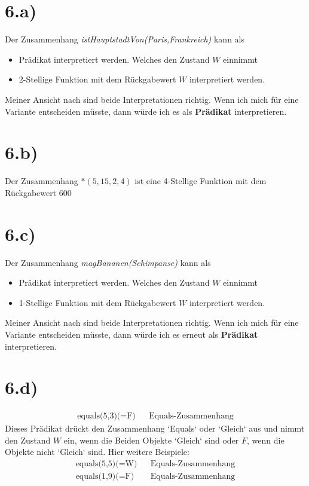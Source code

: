 \documentclass[10pt,ngerman]{scrartcl}
\begin{document}
\section{6.a)}
Der Zusammenhang \textit{istHauptstadtVon(Paris,Frankreich)} kann als
\begin{itemize}
 \item Prädikat interpretiert werden. Welches den Zustand $W$ einnimmt
 \item 2-Stellige Funktion mit dem Rückgabewert $W$ interpretiert werden.
\end{itemize}
Meiner Ansicht nach sind beide Interpretationen richtig. Wenn ich mich für eine Variante entscheiden müsste, dann würde ich es als \textbf{Prädikat} interpretieren.
\section{6.b)}
Der Zusammenhang $*(5,15,2,4)$ ist eine 4-Stellige Funktion mit dem Rückgabewert $600$
\section{6.c)}
Der Zusammenhang \textit{magBananen(Schimpanse)} kann als
\begin{itemize}
 \item Prädikat interpretiert werden. Welches den Zustand $W$ einnimmt
 \item 1-Stellige Funktion mit dem Rückgabewert $W$ interpretiert werden.
\end{itemize}
Meiner Ansicht nach sind beide Interpretationen richtig. Wenn ich mich für eine Variante entscheiden müsste, dann würde ich es erneut als \textbf{Prädikat} interpretieren.
\section{6.d)}
\setcounter{equation}{0}
\begin{align*}
\text{equals(5,3)(=F)} && \text{Equals-Zusammenhang}
\end{align*}
Dieses Prädikat drückt den Zusammenhang `Equals` oder `Gleich` aus und nimmt den Zustand $W$ ein, wenn die Beiden Objekte `Gleich` sind oder $F$, wenn die Objekte nicht `Gleich` sind. Hier weitere Beispiele:
\begin{align*}
\text{equals(5,5)(=W)} && \text{Equals-Zusammenhang}\\
\text{equals(1,9)(=F)} && \text{Equals-Zusammenhang}
\end{align*}
\end{document}
